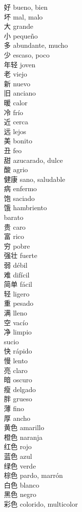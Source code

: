 好 \quad bueno, bien\\
坏 \quad mal, malo\\
大 \quad grande\\
小 \quad pequeño\\
多 \quad abundante, mucho\\
少 \quad escaso, poco\\
年轻 \quad joven\\
老 \quad viejo\\
新 \quad nuevo\\
旧 \quad anciano\\
暖 \quad calor\\
冷 \quad frío\\
近 \quad cerca\\
远 \quad lejos\\
美 \quad bonito\\
丑 \quad feo\\
甜 \quad azucarado, dulce\\
酸 \quad agrio\\
健康 \quad sano, saludable\\
病 \quad enfermo\\
饱 \quad saciado\\
饿 \quad hambriento\\
 \quad barato\\
贵 \quad caro\\
富 \quad rico\\
穷 \quad pobre\\
强壮 \quad fuerte\\
弱 \quad débil\\
难 \quad difícil\\
简单 \quad fácil\\
轻 \quad ligero\\
重 \quad pesado\\
满 \quad lleno\\
空 \quad vacío\\
净 \quad limpio\\
 \quad sucio\\
快 \quad rápido\\
慢 \quad lento\\
亮 \quad claro\\
暗 \quad oscuro\\
瘦 \quad delgado\\
胖 \quad grueso\\
薄 \quad fino\\
厚 \quad ancho\\
黄色 \quad amarillo\\
橙色 \quad naranja\\
红色 \quad rojo\\
蓝色 \quad azul\\
绿色 \quad verde\\
棕色 \quad pardo, marrón\\
白色 \quad blanco\\
黑色 \quad negro\\
彩色 \quad colorido, multicolor\\
